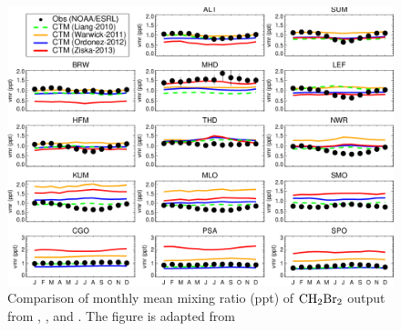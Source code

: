 \begin{figure}
    \centering
    \includegraphics[width =0.9\linewidth]{Appendix/images/Hossaini2013_fig6_ch2br2.png}
    \caption{Comparison of monthly mean mixing ratio (ppt) of $\mathrm{CH_2Br_2}$ output from \cite{Liang2010}, \cite{ziska}, \cite{Warwick2006} and \cite{Ordonez2012}. The figure is adapted from \cite{Hossaini2013}}
    \label{fig:Hosaini_fig6}
\end{figure}

